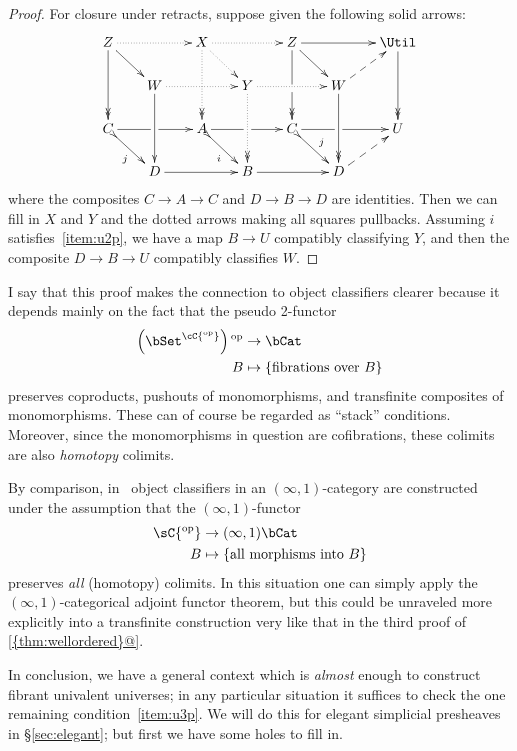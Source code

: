 \documentclass{amsart}
\theoremstyle{remark}
{\newtheorem{{rmk}}[thm]{{Remark}}}
\numberwithin{equation}{section}
\theoremstyle{plain}
\begin{document}
\begin{proof}
  For closure under retracts, suppose given the following solid arrows:
  \[ \xymatrix@-.5pc{
    Z \ar@{.>}[rr] \ar@{->>}[dd] \ar[dr] &&
    X \ar@{.>}[rr] \ar@{.>>}[dd] \ar@{.>}[dr] &&
    Z \ar@{->>}'[d][dd] \ar[dr] \ar[rr] &&
    \Util \ar@{->>}[dd]\\
    & W\ar[dd] \ar@{.>}[rr] &&
    Y \ar@{.>>}[dd] \ar@{.>}[rr] &&
    W \ar@{->>}[dd] \ar@{-->}[ur] \\
    C \ar@{>->}[dr]_j \ar'[r][rr] &&
    A \ar@{>->}[dr]_i \ar'[r][rr] &&
    C \ar@{>->}[dr]^j \ar'[r][rr] && U\\
    & D \ar[rr] &&
    B \ar[rr] &&
    D\ar@{-->}[ur]
  }\]
  where the composites $C\to A\to C$ and $D\to B\to D$ are identities.
  Then we can fill in $X$ and $Y$ and the dotted arrows making all squares pullbacks.
  Assuming $i$ satisfies~\ref{item:u2p}, we have a map $B\to U$ compatibly classifying $Y$, and then the composite $D\to B\to U$ compatibly classifies $W$.
\end{proof}

I say that this proof makes the connection to object classifiers clearer because it depends mainly on the fact that the pseudo 2-functor
\begin{align*}
  \left(\bSet^{\cC{^{\mathrm{op}}}}\right){^{\mathrm{op}}} &\to \bCat\\
  B &\mapsto \{ \text{fibrations over } B \}
\end{align*}
preserves coproducts, pushouts of monomorphisms, and transfinite composites of monomorphisms.
These can of course be regarded as ``stack'' conditions.
Moreover, since the monomorphisms in question are cofibrations, these colimits are also \emph{homotopy} colimits.

By comparison, in~\cite[6.1.6.3]{lurie:higher-topoi} object classifiers in an $(\infty,1)$-category \sC are constructed under the assumption that the $(\infty,1)$-functor
\begin{align*}
  \sC{^{\mathrm{op}}} &\to (\infty,1)\bCat\\
  B &\mapsto \{ \text{all morphisms into } B \}
\end{align*}
preserves \emph{all} (homotopy) colimits.
In this situation one can simply apply the $(\infty,1)$-categorical adjoint functor theorem, but this could be unraveled more explicitly into a transfinite construction very like that in the third proof of {\ref{{thm:wellordered}@}}.

In conclusion, we have a general context which is \emph{almost} enough to construct fibrant univalent universes; in any particular situation it suffices to check the one remaining condition~\ref{item:u3p}.
We will do this for elegant simplicial presheaves in \S\ref{sec:elegant}; but first we have some holes to fill in.
\end{document}
